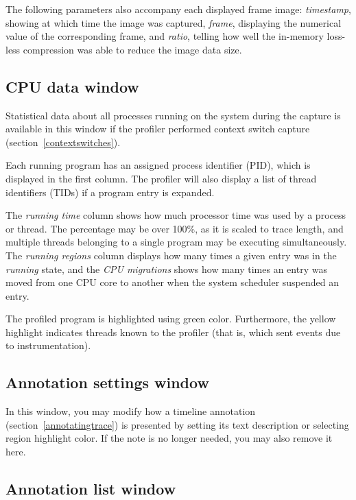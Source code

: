 \documentclass[hidelinks,titlepage,a4paper,twoside]{article}
\begin{document}
The following parameters also accompany each displayed frame image: \emph{timestamp}, showing at which time the image was captured, \emph{frame}, displaying the numerical value of the corresponding frame, and \emph{ratio}, telling how well the in-memory loss-less compression was able to reduce the image data size.

\subsection{CPU data window}
\label{cpudata}

Statistical data about all processes running on the system during the capture is available in this window if the profiler performed context switch capture (section~\ref{contextswitches}).

Each running program has an assigned process identifier (PID), which is displayed in the first column. The profiler will also display a list of thread identifiers (TIDs) if a program entry is expanded.

The \emph{running time} column shows how much processor time was used by a process or thread. The percentage may be over 100\%, as it is scaled to trace length, and multiple threads belonging to a single program may be executing simultaneously. The \emph{running regions} column displays how many times a given entry was in the \emph{running} state, and the \emph{CPU migrations} shows how many times an entry was moved from one CPU core to another when the system scheduler suspended an entry.

The profiled program is highlighted using green color. Furthermore, the yellow highlight indicates threads known to the profiler (that is, which sent events due to instrumentation).

\subsection{Annotation settings window}
\label{annotationsettings}

In this window, you may modify how a timeline annotation (section~\ref{annotatingtrace}) is presented by setting its text description or selecting region highlight color. If the note is no longer needed, you may also remove it here.

\subsection{Annotation list window}
\label{annotationlist}
\end{document}
